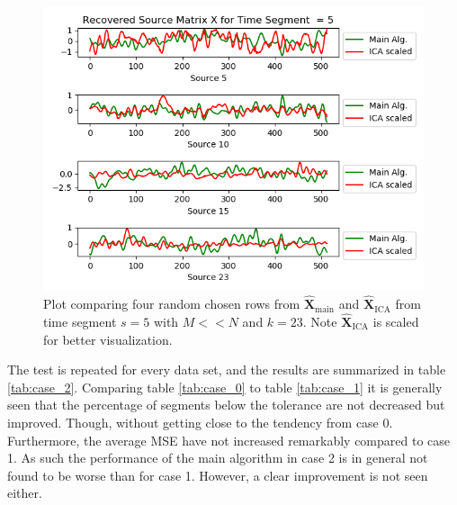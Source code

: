 \begin{figure}[H]
\begin{widepage}
\begin{minipage}[t]{.49\textwidth}
\includegraphics[width=1\linewidth]{figures/ch_7/resultat/EEG_second_removed_scaled_timeseg5S1_CClean.png}
\caption{Plot comparing four random chosen rows from $\hat{\mathbf{X}}_{\text{main}}$ and $\hat{\mathbf{X}}_{\text{ICA}}$ from time segment $s = 5$ with $M << N$ and $k=23$. Note $\hat{\mathbf{X}}_{\text{ICA}}$ is scaled for better visualization.}
	\label{fig:M<<N_3}
    \end{minipage}
\end{widepage}
\end{figure}
\noindent
The test is repeated for every data set, and the results are summarized in table \ref{tab:case_2}. Comparing table \ref{tab:case_0} to table \ref{tab:case_1} it is generally seen that the percentage of segments below the tolerance are not decreased but improved.
Though, without getting close to the tendency from case 0. 
Furthermore, the average MSE have not increased remarkably compared to case 1. 
As such the performance of the main algorithm in case 2 is in general not found to be worse than for case 1.
However, a clear improvement is not seen either.  
